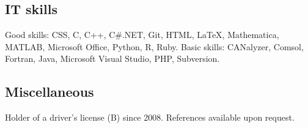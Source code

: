 \documentclass{skvitae}
\begin{document}
	\medskip
	\subsection{IT skills}
	\ind Good skills: CSS, C, C++, C\#.NET, Git, HTML, \LaTeX, Mathematica, MATLAB, Microsoft Office, Python, R, Ruby.
	\ind Basic skills: CANalyzer, Comsol, Fortran, Java, Microsoft Visual Studio, PHP, Subversion.

	\medskip
	\subsection{Miscellaneous}
	\ind Holder of a driver's license (B) since 2008.
	\ind References available upon request.
\end{document}
